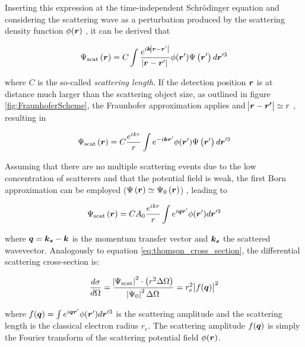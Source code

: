 Inserting this expression at the time-independent Schrödinger equation and considering the scattering wave as a perturbation produced by the scattering density function $\phi(\bm{r})$ \citep{cowley_diffraction_1995}, it can be derived that

\begin{equation}
       \Psi_{\text{scat}}\left( \bm{r} \right)=C \int \frac{e^{ i \bm{k}\abs{\bm{r}-\bm{r}'} } } {\abs{\bm{r}-\bm{r}'}} \phi(\bm{r}')   \Psi\left( \bm{r}' \right) d\bm{r}'^3
\end{equation}

where $C$ is the so-called \emph{scattering length}. If the detection position $\bm{r}$ is at distance much larger than the scattering object size, as outlined in figure \ref{fig:FraunhoferScheme}, the Fraunhofer approximation applies and $\abs{\bm{r}-\bm{r'}} \simeq r$ \citep{feigin_structure_1987}, resulting in

\begin{equation}
       \Psi_{\text{scat}}\left( \bm{r} \right)=C \frac{e^{i k r}}{r} \int e^{ -i \bm{k}\bm{r}' }  \phi(\bm{r}')   \Psi\left( \bm{r}' \right) d\bm{r}'^3
\end{equation}

Assuming that there are no multiple scattering events due to the low concentration of scatterers and that the potential field is weak, the first Born approximation can be employed ($ \Psi\left( \bm{r} \right) \simeq \Psi_0\left( \bm{r} \right)$) \citep{cowley_diffraction_1995}, leading to

\begin{equation}
       \Psi_{\text{scat}}\left( \bm{r} \right)=C A_0 \frac{e^{i k r}}{r} \int e^{ i \bm{q}\bm{r}' }  \phi(\bm{r}')  d\bm{r}'^3
\end{equation}

where $\bm{q}=\bm{k_s} - \bm{k}$ is the momentum transfer vector and $\bm{k_s}$ the scattered wavevector. Analogously to equation \ref{eq:thomson_cross_section}, the differential scattering cross-section is:

\begin{equation}
        \label{eq:rayleigh_cross_section}
        \frac{d\sigma}{d\Omega}= \frac{\abs{\Psi_{\text{scat}}}^2 \cdot \left(r^2 \Delta \Omega \right)}{\abs{\Psi_{0}}^2\Delta \Omega}=r_e^2 \abs{f(\bm{q})}^2
\end{equation}

where $f(\bm{q})=\int e^{ i \bm{q}\bm{r}' }  \phi(\bm{r}')  d\bm{r}'^3$ is the scattering amplitude and the scattering length is the classical electron radius $r_e$. The scattering amplitude  $f(\bm{q})$ is simply the Fourier transform of the scattering potential field $\phi(\bm{r})$. 

